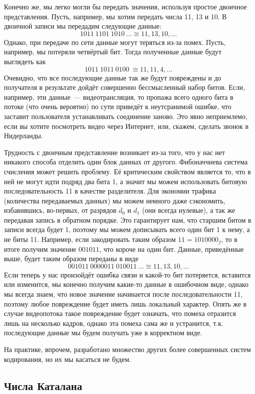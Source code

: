Конечно же, мы легко могли бы передать значения, используя простое двоичное представления. Пусть, например, мы хотим передать числа 11, 13 и 10. В двоичной записи мы передадим следующие данные:
$$1011\ 1101\ 1010\ \ldots \cong 11,13,10,\ldots$$
Однако, при передаче по сети данные могут теряться из-за помех. Пусть, например, мы потеряли четвёртый бит. Тогда полученные данные будут выглядеть как
$$1011\ 1011\ 0100\ \cong 11, 11, 4, \ldots$$
Очевидно, что все последующие данные так же будут повреждены и до получателя в результате дойдёт совершенно бессмысленный набор битов. Если, например, эти данные~--- видеотрансляция, то пропажа всего одного бита в потоке (что очень вероятно) по сути приведёт к неутсранимой ошибке, что заставит пользователя устанавливать соединение заново. Это явно неприемлемо, если вы хотите посмотреть видео через Интернет, или, скажем, сделать звонок в Нидерланды.

Трудность с двоичным представление возникает из-за того, что у нас нет никакого способа отделить один блок данных от другого. Фибоначчиева система счисления может решить проблему. Её критическим свойством является то, что в ней не могут идти подряд два бита 1, а значит мы можем использовать битовую последовательность 11 в качестве разделителя. Для экономии трафика (количества передаваемых данных) мы можем немного даже сэкономить, избавившись, во-первых, от разрядов $d_0$ и $d_1$ (они всегда нулевые), а так же передавая запись в обратном порядке. Это гарантирует нам, что старшим битом в записи всегда будет 1, поэтому мы можем дописывать всего один бит 1 к нему, а не биты 11. Например, если закодировать таким образом $11=1010000_f$, то в итоге получим значение $001011$, что короче на один бит. Данные, приведённые выше, будет таким образом переданы в виде
$$001011\ 0000011\ 010011\ \ldots \cong 11, 13, 10, \ldots$$
Если теперь у нас произойдёт ошибка связи и какой-то бит потеряется, вставится или изменится, мы конечно получим какие-то данные в ошибочном виде, однако мы всегда знаем, что новое значение начинается после последовательности 11, поэтому любое повреждение будет иметь лишь локальный характер. Опять же в случае видеопотока такое повреждение будет означать, что помеха отразится лишь на несколько кадров, однако эта помеха сама же и устранится, т.к. последующие данные мы будем получать уже в корректном виде.

На практике, впрочем, разработано множество других более совершенных систем кодирования, но их мы касаться не будем.

\subsection{Числа Каталана}

